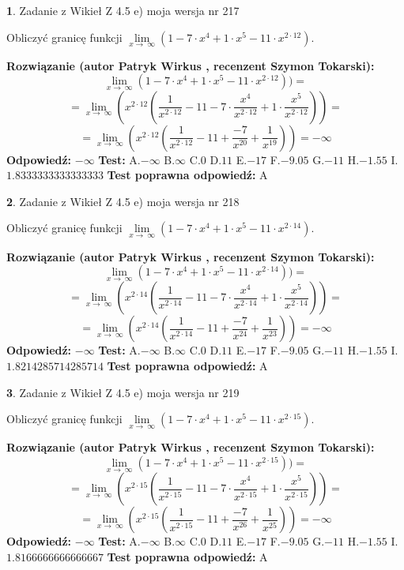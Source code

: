 \documentclass[12pt, a4paper]{article}
\theoremstyle{definition} %
\newtheorem{zad}{}
\newcommand{\zadStart}[1]{\begin{zad}#1\newline}
\newcommand{\zadStop}{\end{zad}}
\newcommand{\rozwStart}[2]{\noindent \textbf{Rozwiązanie (autor #1 , recenzent #2): }\newline}
\newcommand{\rozwStop}{\newline}
\newcommand{\odpStart}{\noindent \textbf{Odpowiedź:}\newline}
\newcommand{\odpStop}{\newline}
\newcommand{\testStart}{\noindent \textbf{Test:}\newline}
\newcommand{\testStop}{\newline}
\newcommand{\kluczStart}{\noindent \textbf{Test poprawna odpowiedź:}\newline}
\newcommand{\kluczStop}{\newline}
\begin{document}
\zadStart{Zadanie z Wikieł Z 4.5 e) moja wersja nr 217}


Obliczyć granicę funkcji  $\lim\limits_{x\to\ \infty}(1 - 7 \cdot x^{4}+1 \cdot x^{5}- 11 \cdot x^{2\cdot12})$.
\zadStop
\rozwStart{Patryk Wirkus}{Szymon Tokarski}
$$\lim\limits_{x\to\ \infty}(1 - 7 \cdot x^{4}+1 \cdot x^{5}- 11 \cdot x^{2\cdot12}))=$$
$$=\lim\limits_{x\to\ \infty}(x^{2\cdot12}(\frac{1}{x^{2\cdot12}}-11 -7 \cdot \frac{x^{4}}{x^{2\cdot12}}+1 \cdot \frac{x^{5}}{x^{2\cdot12}}))=$$
$$=\lim\limits_{x\to\ \infty}(x^{2\cdot12}(\frac{1}{x^{2\cdot12}}-11 + \frac{-7}{x^{20}}+ \frac{1}{x^{19}}))=-\infty$$
\rozwStop
\odpStart
$-\infty$
\odpStop
\testStart
A.$-\infty$ B.$\infty$ C.$0$ D.$11$ E.$-17$
F.$-9.05$ G.$-11$
H.$-1.55$
I.$1.8333333333333333$
\testStop
\kluczStart
A
\kluczStop



\zadStart{Zadanie z Wikieł Z 4.5 e) moja wersja nr 218}


Obliczyć granicę funkcji  $\lim\limits_{x\to\ \infty}(1 - 7 \cdot x^{4}+1 \cdot x^{5}- 11 \cdot x^{2\cdot14})$.
\zadStop
\rozwStart{Patryk Wirkus}{Szymon Tokarski}
$$\lim\limits_{x\to\ \infty}(1 - 7 \cdot x^{4}+1 \cdot x^{5}- 11 \cdot x^{2\cdot14}))=$$
$$=\lim\limits_{x\to\ \infty}(x^{2\cdot14}(\frac{1}{x^{2\cdot14}}-11 -7 \cdot \frac{x^{4}}{x^{2\cdot14}}+1 \cdot \frac{x^{5}}{x^{2\cdot14}}))=$$
$$=\lim\limits_{x\to\ \infty}(x^{2\cdot14}(\frac{1}{x^{2\cdot14}}-11 + \frac{-7}{x^{24}}+ \frac{1}{x^{23}}))=-\infty$$
\rozwStop
\odpStart
$-\infty$
\odpStop
\testStart
A.$-\infty$ B.$\infty$ C.$0$ D.$11$ E.$-17$
F.$-9.05$ G.$-11$
H.$-1.55$
I.$1.8214285714285714$
\testStop
\kluczStart
A
\kluczStop



\zadStart{Zadanie z Wikieł Z 4.5 e) moja wersja nr 219}


Obliczyć granicę funkcji  $\lim\limits_{x\to\ \infty}(1 - 7 \cdot x^{4}+1 \cdot x^{5}- 11 \cdot x^{2\cdot15})$.
\zadStop
\rozwStart{Patryk Wirkus}{Szymon Tokarski}
$$\lim\limits_{x\to\ \infty}(1 - 7 \cdot x^{4}+1 \cdot x^{5}- 11 \cdot x^{2\cdot15}))=$$
$$=\lim\limits_{x\to\ \infty}(x^{2\cdot15}(\frac{1}{x^{2\cdot15}}-11 -7 \cdot \frac{x^{4}}{x^{2\cdot15}}+1 \cdot \frac{x^{5}}{x^{2\cdot15}}))=$$
$$=\lim\limits_{x\to\ \infty}(x^{2\cdot15}(\frac{1}{x^{2\cdot15}}-11 + \frac{-7}{x^{26}}+ \frac{1}{x^{25}}))=-\infty$$
\rozwStop
\odpStart
$-\infty$
\odpStop
\testStart
A.$-\infty$ B.$\infty$ C.$0$ D.$11$ E.$-17$
F.$-9.05$ G.$-11$
H.$-1.55$
I.$1.8166666666666667$
\testStop
\kluczStart
A
\kluczStop
\end{document}
